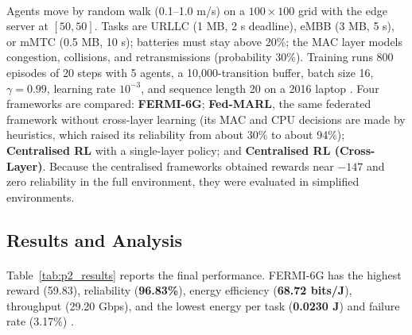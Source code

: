 \documentclass[12pt,a4paper,final]{extreport}
\begin{document}
\paragraph{} Agents move by random walk (0.1--1.0 m/s) on a $100\times100$ grid with the edge server at $[50,50]$. Tasks are URLLC (1 MB, 2 s deadline), eMBB (3 MB, 5 s), or mMTC (0.5 MB, 10 s); batteries must stay above 20\%; the MAC layer models congestion, collisions, and retransmissions (probability 30\%). Training runs 800 episodes of 20 steps with 5 agents, a 10{,}000-transition buffer, batch size 16, $\gamma=0.99$, learning rate $10^{-3}$, and sequence length 20 on a 2016 laptop \cite{p2}. Four frameworks are compared: \textbf{FERMI-6G}; \textbf{Fed-MARL}, the same federated framework without cross-layer learning (its MAC and CPU decisions are made by heuristics, which raised its reliability from about 30\% to about 94\%); \textbf{Centralised RL} with a single-layer policy; and \textbf{Centralised RL (Cross-Layer)}. Because the centralised frameworks obtained rewards near $-147$ and zero reliability in the full environment, they were evaluated in simplified environments.

\subsection{Results and Analysis}

\paragraph{} Table~\ref{tab:p2_results} reports the final performance. FERMI-6G has the highest reward (59.83), reliability (\textbf{96.83\%}), energy efficiency (\textbf{68.72 bits/J}), throughput (29.20 Gbps), and the lowest energy per task (\textbf{0.0230 J}) and failure rate (3.17\%) \cite{p2}.
\end{document}
